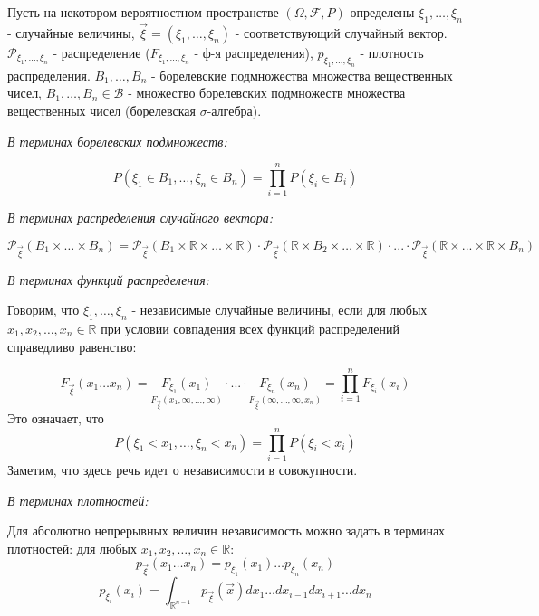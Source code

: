 \begin{definition}
	Пусть на некотором вероятностном пространстве $(\Omega, \mathcal{F}, P)$ определены $\xi_1, \dots, \xi_n$ - случайные величины, $\vec{\xi} = (\xi_1, \dots, \xi_n)$ - соответствующий случайный вектор. $\mathcal{P}_{\xi_1, \dots, \xi_n}$ - распределение ($F_{\xi_1, \dots, \xi_n}$ - ф-я распределения), $p_{\xi_1, \dots, \xi_n}$ - плотность распределения. $B_1, \dots, B_n$ - борелевские подмножества множества вещественных чисел, $B_1, \dots, B_n \in \mathcal{B}$ - множество борелевских подмножеств множества вещественных чисел (борелевская $\sigma$-алгебра).
	
	\textit{В терминах борелевских подмножеств:}
	
	\[ P(\xi_1 \in B_1, \dots, \xi_n \in B_n) = \prod_{i=1}^{n} P(\xi_i \in B_i) \]
	
	\textit{В терминах распределения случайного вектора:}
	
	\[ \mathcal{P}_{\vec{\xi}} (B_1 \times \dots \times B_n) = \mathcal{P}_{\vec{\xi}} (B_1 \times \mathbb{R} \times \dots \times \mathbb{R}) \cdot \mathcal{P}_{\vec{\xi}} (\mathbb{R} \times B_2 \times \dots \times \mathbb{R}) \cdot ... \cdot \mathcal{P}_{\vec{\xi}} (\mathbb{R} \times ... \times \mathbb{R} \times B_n) \]
	
	\textit{В терминах функций распределения:}
	
	Говорим, что $\xi_1, \dots, \xi_n$ - независимые случайные величины, если для любых $x_1, x_2, \dots, x_n \in \mathbb{R}$ при условии совпадения всех функций распределений справедливо равенство:
	
	\[ F_{\vec{\xi}} (x_1 \dots x_n) = \underset{F_{\vec{\xi}}(x_1, \infty, \dots, \infty)}{F_{\xi_1}(x_1)} \cdot ... \cdot \underset{F_{\vec{\xi}}(\infty, \dots, \infty, x_n)}{F_{\xi_n}(x_n)} = \prod_{i=1}^{n} F_{\xi_i} (x_i) \]
	Это означает, что
	\[ P(\xi_1 < x_1, \dots, \xi_n < x_n) = \prod_{i=1}^{n} P(\xi_i < x_i) \]
	Заметим, что здесь речь идет о независимости в совокупности.
	
	\textit{В терминах плотностей:}
	
	Для абсолютно непрерывных величин независимость можно задать в терминах плотностей: для любых $x_1, x_2, \dots, x_n \in \mathbb{R}$:
	\[ p_{\vec{\xi}} (x_1 \dots x_n) = p_{\xi_1} (x_1) \dots p_{\xi_n} (x_n) \]
	\[ p_{\xi_i} (x_i) = \int_{\mathbb{R}^{n-1}} p_{\vec{\xi}} (\vec{x}) dx_1 \dots dx_{i-1} dx_{i+1} \dots dx_n \]
\end{definition}

